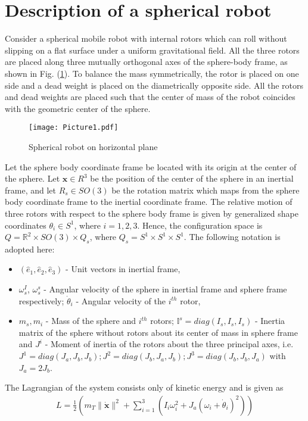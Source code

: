 \documentclass{ifacconf}
\begin{document}
\section{Description of a spherical robot}
Consider a spherical mobile robot  with internal rotors which can roll without slipping on a flat surface under a uniform gravitational field. All the three rotors are placed along three mutually orthogonal axes of the sphere-body frame, as shown in Fig. (\ref{rotor_fig}). To balance the mass symmetrically, the rotor is placed on one side and a dead weight is placed on the diametrically opposite side. All the rotors and dead weights are placed such that the center of mass of the robot coincides with the geometric center of the sphere. 
\begin{figure}[h]
\centering
\texttt{[image: Picture1.pdf]}
\caption{Spherical robot on horizontal plane}
\label{rotor_fig}
\end{figure}
Let the sphere body coordinate frame be located with its origin at the center of the sphere. Let $\mathbf{x} \in R^{3}$ be the position of the center of the sphere in an inertial frame, and let $R_{s}\in SO(3)$ be the rotation matrix which maps from the sphere body coordinate frame to the inertial coordinate frame. The relative motion of three rotors with respect to the sphere body frame is given by generalized shape coordinates $\theta_{i} \in S^{1}$,  where $i = 1,2,3$. Hence, the configuration space is $Q={\mathbb R}^{2} \times SO(3)\times Q_{s}$, where $Q_{s} = S^{1} \times S^{1} \times S^{1}$. The following notation is adopted here:
\begin{itemize}
\item $(\hat{e}_{1},\hat{e}_{2},\hat{e}_{3})$ - Unit vectors in inertial frame,
\item $\omega_{s}^{I}$, $\omega_{s}^{s}$ - Angular velocity of the sphere in inertial frame and sphere frame respectively; $\dot{\theta}_{i}$ - Angular velocity of the $i^{th}$ rotor,
\item $m_{s}, m_{i}$ - Mass of the sphere and $i^{th}$ rotors; $\mathbb{I}^{s} = diag(I_{s},I_{s},I_{s})$ - Inertia matrix of the sphere without rotors about its center of mass in sphere frame and $J^{i} $ - Moment of inertia of the rotors about the three principal axes, i.e. $J^{1}=diag(J_{a},J_{b},J_{b});J^{2}=diag(J_{b},J_{a},J_{b});J^{3}=diag(J_{b},J_{b},J_{a})$ with $J_{a}=2J_{b}$.
\end{itemize}
The Lagrangian of the system consists only of kinetic energy and is given as
\begin{align*}
L = \frac{1}{2} \left( m_{T} \|\dot{\mathbf{x}}\|^{2} +  \sum_{i=1}^{3} (I_{i} \omega_{i}^{2} + J_{a}(\omega_{i} + \dot{\theta}_{i})^{2}) \right)
\end{align*}
\end{document}
